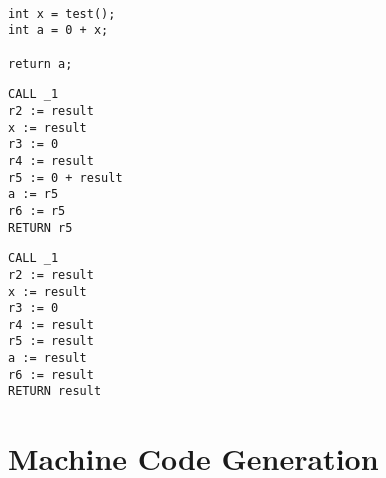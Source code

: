 \documentclass{article}
\begin{document}
\begin{minipage}{0.3\textwidth}
\begin{lstlisting}

int x = test();
int a = 0 + x;

return a;
\end{lstlisting}
\end{minipage}%
\begin{minipage}{0.3\textwidth}
\begin{lstlisting}
CALL _1
r2 := result
x := result
r3 := 0
r4 := result
r5 := 0 + result
a := r5
r6 := r5
RETURN r5
\end{lstlisting}
\end{minipage}%
\begin{minipage}{0.3\textwidth}
\begin{lstlisting}
CALL _1
r2 := result
x := result
r3 := 0
r4 := result
r5 := result
a := result
r6 := result
RETURN result
\end{lstlisting}
\end{minipage}%



\section{Machine Code Generation}
\end{document}
